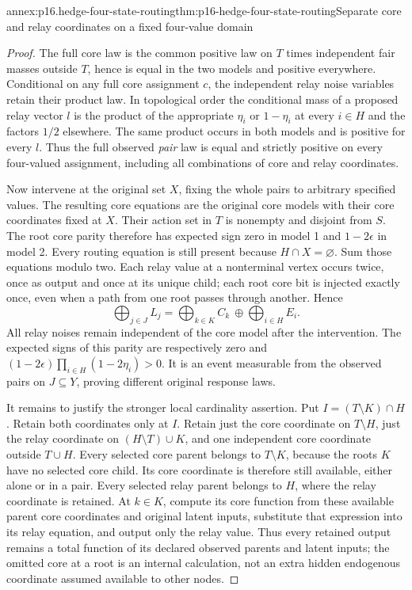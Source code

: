 \begin{annexitem}{annex:p16.hedge-four-state-routing}{thm:p16-hedge-four-state-routing}{Separate core and relay coordinates on a fixed four-value domain}
\begin{proof}
The full core law is the common positive law on \(T\) times
independent fair masses outside \(T\), hence is equal in the
two models and positive everywhere. Conditional on any full core
assignment \(c\), the independent relay noise variables retain
their product law. In topological order the conditional mass of a
proposed relay vector \(l\) is the product of the appropriate
\(\eta_i\) or \(1-\eta_i\) at every \(i\in H\) and
the factors \(1/2\) elsewhere. The same product occurs in both
models and is positive for every \(l\). Thus the full observed
\emph{pair} law is equal and strictly positive on every four-valued
assignment, including all combinations of core and relay coordinates.

Now intervene at the original set \(X\), fixing the whole pairs
to arbitrary specified values. The resulting core equations are
the original core models with their core coordinates fixed at
\(X\). Their action set in \(T\) is nonempty and disjoint
from \(S\). The root core parity therefore has expected sign
zero in model 1 and \(1-2\epsilon\) in model 2. Every routing
equation is still present because \(H\cap X=\varnothing\).
Sum those equations modulo two. Each relay value at a nonterminal
vertex occurs twice, once as output and once at its unique child;
each root core bit is injected exactly once, even when a path from
one root passes through another. Hence
\[
 \bigoplus_{j\in J}L_j
   =\bigoplus_{k\in K}C_k\ \oplus\!
     \bigoplus_{i\in H}E_i.
\]
All relay noises remain independent of the core model after the
intervention. The expected signs of this parity are respectively
zero and
\((1-2\epsilon)\prod_{i\in H}(1-2\eta_i)>0\).
It is an event measurable from the observed pairs on
\(J\subseteq Y\), proving different original response laws.

It remains to justify the stronger local cardinality assertion.
Put \(I=(T\setminus K)\cap H\). Retain both coordinates
only at \(I\). Retain just the core coordinate on \(T\setminus H\),
just the relay coordinate on \((H\setminus T)\cup K\), and
one independent core coordinate outside \(T\cup H\).
Every selected core parent belongs to \(T\setminus K\),
because the roots \(K\) have no selected core child. Its core
coordinate is therefore still available, either alone or in a pair.
Every selected relay parent belongs to \(H\), where the relay
coordinate is retained. At \(k\in K\), compute its core
function from these available parent core coordinates and original
latent inputs, substitute that expression into its relay equation,
and output only the relay value. Thus every retained output remains
a total function of its declared observed parents and latent inputs;
the omitted core at a root is an internal calculation, not an
extra hidden endogenous coordinate assumed available to other nodes.


\end{proof}
\end{annexitem}
